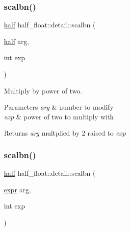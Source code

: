 \subsubsection{\texorpdfstring{scalbn()}{scalbn()}\hspace{0.1cm}{\footnotesize\ttfamily [1/2]}}
{\footnotesize\ttfamily \hyperlink{classhalf__float_1_1half}{half} half\+\_\+float\+::detail\+::scalbn (\begin{DoxyParamCaption}\item[{\hyperlink{classhalf__float_1_1half}{half}}]{arg,  }\item[{int}]{exp }\end{DoxyParamCaption})\hspace{0.3cm}{\ttfamily [inline]}}

Multiply by power of two. 
\begin{DoxyParams}{Parameters}
{\em arg} & number to modify \\
\hline
{\em exp} & power of two to multiply with \\
\hline
\end{DoxyParams}
\begin{DoxyReturn}{Returns}
{\itshape arg} multplied by 2 raised to {\itshape exp} 
\end{DoxyReturn}
\mbox{\label{namespacehalf__float_1_1detail_ad38a2f6279448caa187ea823b520085c}} 
\subsubsection{\texorpdfstring{scalbn()}{scalbn()}\hspace{0.1cm}{\footnotesize\ttfamily [2/2]}}
{\footnotesize\ttfamily \hyperlink{classhalf__float_1_1half}{half} half\+\_\+float\+::detail\+::scalbn (\begin{DoxyParamCaption}\item[{\hyperlink{structhalf__float_1_1detail_1_1expr}{expr}}]{arg,  }\item[{int}]{exp }\end{DoxyParamCaption})\hspace{0.3cm}{\ttfamily [inline]}}

\mbox{\label{namespacehalf__float_1_1detail_a889e57734de1100a401c1f148d1e6354}} 

